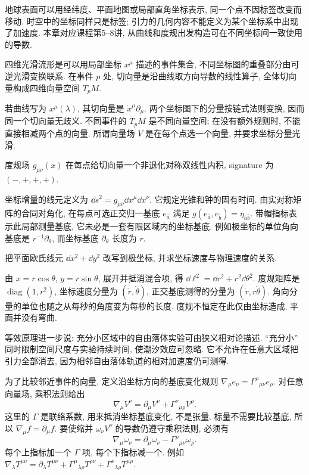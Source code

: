 \label{ch:connection}
地球表面可以用经纬度、平面地图或局部直角坐标表示, 同一个点不因标签改变而移动. 时空中的坐标同样只是标签; 引力的几何内容不能定义为某个坐标系中出现了加速度. 本章对应课程第5--8讲, 从曲线和度规出发构造可在不同坐标间一致使用的导数.

\begin{definition}
四维光滑流形是可以用局部坐标 $x^\mu$ 描述的事件集合, 不同坐标图的重叠部分由可逆光滑变换联系. 在事件 $p$ 处, 切向量是沿曲线取方向导数的线性算子, 全体切向量构成四维向量空间 $T_pM$.
\end{definition}
若曲线写为 $x^\mu(\lambda)$, 其切向量是 $\dot x^\mu\partial_\mu$. 两个坐标图下的分量按链式法则变换, 因而同一个切向量无歧义. 不同事件的 $T_pM$ 是不同向量空间; 在没有额外规则时, 不能直接相减两个点的向量. 所谓向量场 $V$ 是在每个点选一个向量, 并要求坐标分量光滑.

度规场 $g_{\mu\nu}(x)$ 在每点给切向量一个非退化对称双线性内积, signature 为 $(-,+,+,+)$.

坐标增量的线元定义为 \mbox{$\dd s^2=g_{\mu\nu}\dd x^\mu\dd x^\nu$}. 它规定光锥和钟的固有时间. 由实对称矩阵的合同对角化, 在每点可选正交归一基底 $e_{\hat a}$ 满足 $g(e_{\hat a},e_{\hat b})=\eta_{\hat a\hat b}$. 带帽指标表示此局部测量基底, 它未必是一套有限区域内的坐标基底. 例如极坐标的单位角向基底是 $r^{-1}\partial_\theta$, 而坐标基底 $\partial_\theta$ 长度为 $r$.

\begin{example}
把平面欧氏线元 $\dd x^2+\dd y^2$ 改写到极坐标, 并求坐标速度与物理速度的关系.
\end{example}
\begin{solution}
由 $x=r\cos\theta$, $y=r\sin\theta$, 展开并抵消混合项, 得 $\dd\ell^2=\dd r^2+r^2\dd\theta^2$. 度规矩阵是 $\operatorname{diag}(1,r^2)$, 坐标速度分量为 $(\dot r,\dot\theta)$, 正交基底测得的分量为 $(\dot r,r\dot\theta)$. 角向分量的单位也随之从每秒的角度变为每秒的长度. 度规不恒定在此仅由坐标造成, 平面并没有弯曲.
\end{solution}

等效原理进一步说: 充分小区域中的自由落体实验可由狭义相对论描述. ``充分小'' 同时限制空间尺度与实验持续时间, 使潮汐效应可忽略. 它不允许在任意大区域把引力全部消去, 因为相邻自由落体轨道的相对加速度仍可测得.

为了比较邻近事件的向量, 定义沿坐标方向的基底变化规则 $\nabla_\mu e_\nu=\Gamma^\rho{}_{\mu\nu}e_\rho$. 对任意向量场, 乘积法则给出
\begin{equation}\label{eq:covder}
\nabla_\mu V^\nu=\partial_\mu V^\nu+\Gamma^\nu{}_{\mu\rho}V^\rho.
\end{equation}
这里的 $\Gamma$ 是联络系数, 用来抵消坐标基底变化, 不是张量. 标量不需要比较基底, 所以 $\nabla_\mu f=\partial_\mu f$. 要使缩并 $\omega_\nu V^\nu$ 的导数仍遵守乘积法则, 必须有
\begin{equation}\label{eq:oneform-derivative}
\nabla_\mu\omega_\nu=\partial_\mu\omega_\nu-\Gamma^\rho{}_{\mu\nu}\omega_\rho.
\end{equation}
每个上指标加一个 $\Gamma$ 项, 每个下指标减一个. 例如
$\nabla_\lambda T^{\mu\nu}=\partial_\lambda T^{\mu\nu}+\Gamma^\mu{}_{\lambda\rho}T^{\rho\nu}+\Gamma^\nu{}_{\lambda\rho}T^{\mu\rho}$.

